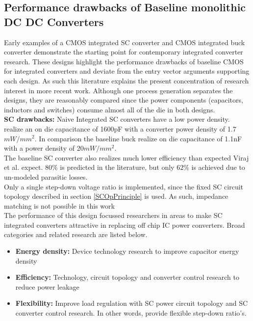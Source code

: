 \documentclass[letterpaper,twocolumn,10pt]{article}
\begin{document}
\subsection{Performance drawbacks of Baseline monolithic DC DC Converters}
Early examples of a CMOS integrated SC converter \cite{Viraj2007} and CMOS integrated buck converter \cite{Alimadadi2008} demonstrate the starting point for contemporary integrated converter research. These designs highlight the performance drawbacks of baseline CMOS for integrated converters and deviate from the entry vector arguments supporting each design. As such this literature explains the present concentration of research interest in more recent work. %
Although one process generation separates the designs, they are reasonably compared since the power components (capacitors, inductors and switches) consume almost all of the die in both designs.\\ 
\textbf{SC drawbacks: } Naive Integrated SC converters have a low power density. \cite{Viraj2007} realize an on die capacitance of 1600pF with a converter power density of 1.7$mW/mm^2$. In comparison  the baseline buck \cite{Alimadadi2008} realize on die capacitance of 1.1nF with a power density of 20$mW/mm^2$.\\
The baseline SC converter also realizes much lower efficiency than expected Viraj et al. expect. $80\%$ is predicted in the literature, but only $62\%$ is achieved due to un-modeled parasitic losses.\\
Only a single step-down voltage ratio is implemented, since the fixed SC circuit topology described in section \ref{SCOpPrinciple} is used. As such, impedance matching is not possible in this work\\
The performance of this design focussed researchers in areas to make SC integrated converters attractive in replacing off chip IC power converters. Broad categories and related research are listed below.\\
\begin{itemize}
\item \textbf{Energy density: }Device technology research to improve capacitor energy density
\item \textbf{Efficiency: }Technology, circuit topology and converter control research to reduce power leakage
\item \textbf{Flexibility: }Improve load regulation with SC power circuit topology and SC converter control research. In other words, provide flexible step-down ratio's. 
\end{itemize}
\end{document}
